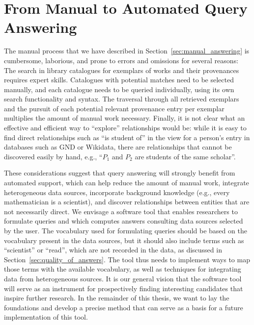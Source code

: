 \section{From Manual to Automated Query Answering}
\label{sec:manual_vs_automated}

The manual process that we have described in Section~\ref{sec:manual_answering}
is cumbersome, laborious, and prone to errors and omissions for several reasons:
The search in library catalogues for exemplars of works and their provenances requires expert skills.
Catalogues with potential matches need to be selected manually,
and each catalogue needs to be queried individually, using its own search functionality and syntax. 
The traversal through all retrieved exemplars and the pursuit of each potential relevant provenance entry per exemplar 
multiplies the amount of manual work necessary.
Finally, it is not clear what an effective and efficient way to \enquote{explore} relationships would be:
while it is easy to find direct relationships such as \enquote{is student of} in the view for a person's entry
in databases such as GND or Wikidata, there are relationships that cannot be discovered easily by hand,
e.g., \enquote{$P_1$ and $P_2$ are students of the same scholar}.

These considerations suggest that query answering will
strongly benefit from automated support,
which can help reduce the amount of manual work, integrate heterogeneous data sources,
incorporate background knowledge (e.g., every mathematician is a scientist),
and discover relationships between entities that are not necessarily direct.
We envisage a software tool that enables researchers to formulate queries 
and which computes answers consulting data sources selected by the user.
The vocabulary used for formulating queries should be based on the vocabulary
present in the data sources, but it should also include terms such as \enquote{scientist} or \enquote{read},
which are not recorded in the data, as discussed in
Section~\ref{sec:quality_of_answers}. The tool thus needs to implement ways
to map those terms with the available vocabulary, as well as techniques
for integrating data from heterogeneous sources.
It is our general vision that the software tool will serve as an instrument for prospectively finding interesting
candidates that inspire further research.
In the remainder of this thesis, we want to lay the foundations and develop a precise method
that can serve as a basis for a future implementation of this tool.

